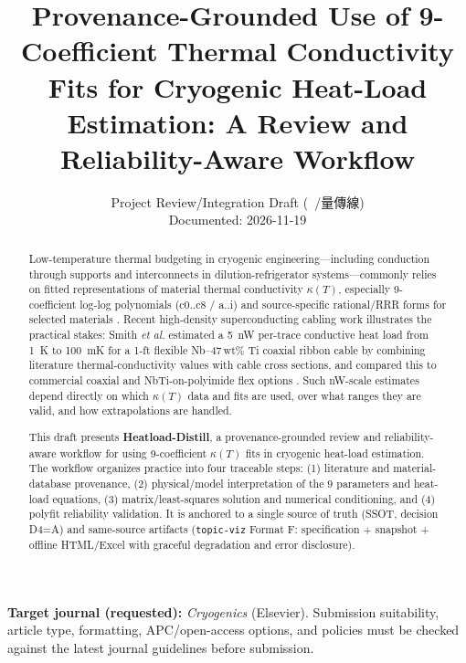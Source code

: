 \documentclass[11pt,a4paper]{article}
\title{Provenance-Grounded Use of 9-Coefficient Thermal Conductivity Fits for Cryogenic Heat-Load Estimation: A Review and Reliability-Aware Workflow}
\author{Project Review/Integration Draft (~/量傳線)\\Documented: 2026-11-19}
\date{}
\begin{document}
\maketitle

\noindent\textbf{Target journal (requested):} \textit{Cryogenics} (Elsevier). Submission suitability, article type, formatting, APC/open-access options, and policies must be checked against the latest journal guidelines before submission.

\begin{abstract}
Low-temperature thermal budgeting in cryogenic engineering---including conduction through supports and interconnects in dilution-refrigerator systems---commonly relies on fitted representations of material thermal conductivity $\kappa(T)$, especially 9-coefficient log-log polynomials (c0..c8 / a..i) and source-specific rational/RRR forms for selected materials \cite{nist,marquardt,bradley,simon1992,flynn,raicu2025}. Recent high-density superconducting cabling work illustrates the practical stakes: Smith \textit{et al.} estimated a 5~nW per-trace conductive heat load from 1~K to 100~mK for a 1-ft flexible Nb--47\,wt\% Ti coaxial ribbon cable by combining literature thermal-conductivity values with cable cross sections, and compared this to commercial coaxial and NbTi-on-polyimide flex options \cite{smith2024}. Such nW-scale estimates depend directly on which $\kappa(T)$ data and fits are used, over what ranges they are valid, and how extrapolations are handled.

This draft presents \textbf{Heatload-Distill}, a provenance-grounded review and reliability-aware workflow for using 9-coefficient $\kappa(T)$ fits in cryogenic heat-load estimation. The workflow organizes practice into four traceable steps: (1) literature and material-database provenance, (2) physical/model interpretation of the 9 parameters and heat-load equations, (3) matrix/least-squares solution and numerical conditioning, and (4) polyfit reliability validation. It is anchored to a single source of truth (SSOT, decision D4=A) and same-source artifacts (\texttt{topic-viz} Format F: specification + snapshot + offline HTML/Excel with graceful degradation and error disclosure).


\end{abstract}
\end{document}
